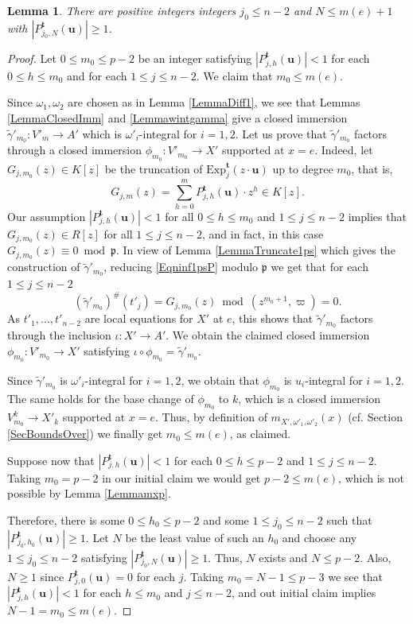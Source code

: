 \documentclass[11pt]{amsart}
\newtheorem{lemma}[theorem]{Lemma}
\theoremstyle{remark}
\numberwithin{equation}{section}
\newcommand{\pfrak}{\mathfrak{p}}
\newcommand{\ttt}{\mathbf{t}}
\newcommand{\uu}{\mathbf{u}}
\newcommand{\Exp}{\mathrm{Exp}}
\begin{document}
\begin{lemma}\label{LemmaBdNm} There are positive integers integers  $j_0\le n-2$ and $N\le m(e)+1$ with $|P^{\ttt}_{j_0,N}(\uu)|\ge 1$.
\end{lemma}
\begin{proof} Let $0\le m_0\le p-2$ be an integer satisfying $|P^{\ttt}_{j,h}(\uu)|< 1$ for each $0\le h\le m_0$ and for each $1\le j\le n-2$. We claim that $m_0\le m(e)$.

Since $\omega_1,\omega_2$ are chosen as in Lemma \ref{LemmaDiff1}, we see that Lemmas \ref{LemmaClosedImm} and \ref{Lemmawintgamma} give a closed immersion $\tilde{\gamma}'_{m_0}: V'_m\to A'$ which is $\omega'_i$-integral for $i=1,2$. Let us prove that $\tilde{\gamma}'_{m_0}$ factors through a closed immersion $\phi_{m_0}:V'_{m_0}\to X'$ supported at $x=e$. Indeed, let $G_{j,m_0}(z)\in K[z]$ be the truncation of $\Exp^\ttt_{j}(z\cdot \uu)$ up to degree $m_0$, that is,
$$
G_{j,m}(z)=\sum_{h=0}^m  P^{\ttt}_{j,h}(\uu)\cdot z^h\in K[z].
$$
Our assumption $|P^{\ttt}_{j,h}(\uu)|< 1$ for all $0\le h\le m_0$ and $1\le j\le n-2$ implies that $G_{j,m_0}(z)\in R[z]$ for all $1\le j\le n-2$, and in fact, in this case $G_{j,m_0}(z)\equiv 0 \bmod \pfrak$. In view of Lemma \ref{LemmaTruncate1ps} which gives the construction of $\tilde{\gamma}'_{m_0}$, reducing  \eqref{Eqninf1psP} modulo $\pfrak$ we get  that for each $1\le j\le n-2$
$$
(\tilde{\gamma}'_{m_0})^\#(t'_j)= G_{j,m_0}(z) \bmod (z^{m_0+1},\varpi)=0.
$$
As $t'_1,...,t'_{n-2}$ are local equations for $X'$ at $e$, this shows that $\tilde{\gamma}'_{m_0}$ factors through the inclusion $\iota:X'\to A'$. We obtain the claimed closed immersion $\phi_{m_0}:V'_{m_0}\to X'$ satisfying $\iota\circ \phi_{m_0}=\tilde{\gamma}'_{m_0}$.

Since $\tilde{\gamma}'_{m_0}$ is $\omega'_i$-integral for $i=1,2$, we obtain that $\phi_{m_0}$ is $u_i$-integral for $i=1,2$. The same holds for the base change of $\phi_{m_0}$ to $k$, which is a closed immersion $V^k_{m_0}\to X'_k$ supported at $x=e$. Thus, by definition of $m_{X',\omega'_1,\omega'_2}(x)$ (cf. Section \ref{SecBoundsOver}) we finally get $m_0\le m(e)$, as claimed.

Suppose now that $|P^{\ttt}_{j,h}(\uu)|< 1$ for each $0\le h\le p-2$ and $1\le j\le n-2$. Taking $m_0=p-2$ in our initial claim we would get $p-2\le m(e)$, which is not possible by Lemma \ref{Lemmamxp}. 

Therefore, there is some $0\le h_0\le p-2$ and some $1\le j_0\le n-2$ such that $|P^{\ttt}_{j_0,h_0}(\uu)|\ge 1$. Let $N$ be the least value of such an $h_0$ and choose any $1\le j_0\le n-2$ satisfying $|P^{\ttt}_{j_0,N}(\uu)|\ge 1$. Thus, $N$ exists and $N\le p-2$. Also, $N\ge 1$ since $P^{\ttt}_{j,0}(\uu)=0$ for each $j$. Taking $m_0=N-1\le p-3$ we see that $|P^{\ttt}_{j,h}(\uu)|< 1$ for each $h\le m_0$ and  $j\le n-2$, and out initial claim implies $N-1=m_0\le m(e)$.
\end{proof}
\end{document}
